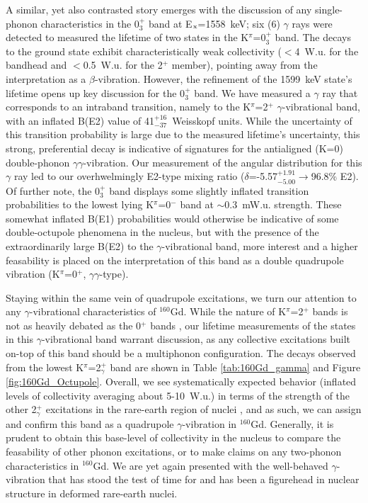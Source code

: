 A similar, yet also contrasted story emerges with the discussion of any single-phonon characteristics in the 0$^+_3$ band at E$_{\rm x}$=1558~keV; six (6) $\gamma$ rays were detected to measured the lifetime of two states in the K$^\pi$=0$^+_3$ band. The decays to the ground state exhibit characteristically weak collectivity ($<$4~W.u. for the bandhead and $<$0.5~W.u. for the 2$^+$ member), pointing away from the interpretation as a $\beta$-vibration. However, the refinement of the 1599~keV state's lifetime opens up key discussion for the 0$^+_3$ band. We have measured a $\gamma$ ray that corresponds to an intraband transition, namely to the K$^\pi$=2$^+$ $\gamma$-vibrational band, with an inflated B(E2) value of 41$^{+16}_{-37}$~Weisskopf units. While the uncertainty of this transition probability is large due to the measured lifetime's uncertainty, this strong, preferential decay is indicative of signatures for the antialigned (K=0) double-phonon $\gamma\gamma$-vibration. Our measurement of the angular distribution for this $\gamma$ ray led to our overhwelmingly E2-type mixing ratio ($\delta$=-5.57$^{+1.91}_{-5.00}\rightarrow$96.8\% E2). Of further note, the 0$^+_3$ band displays some slightly inflated transition probabilities to the lowest lying K$^\pi$=0$^-$ band at $\sim$0.3~mW.u. strength. These somewhat inflated B(E1) probabilities would otherwise be indicative of some double-octupole phenomena in the nucleus, but with the presence of the extraordinarily large B(E2) to the $\gamma$-vibrational band, more interest and a higher feasability is placed on the interpretation of this band as a double quadrupole vibration (K$^\pi$=0$^+$, $\gamma\gamma$-type). 

Staying within the same vein of quadrupole excitations, we turn our attention to any $\gamma$-vibrational characteristics of $^{160}$Gd. While the nature of K$^\pi$=2$^+$ bands is not as heavily debated as the 0$^+$ bands \cite{McGowan_BE2_1981,Burke_hexadecapole1994,PhysRevC.54.679,JAMMARI_1988}, our lifetime measurements of the states in this $\gamma$-vibrational band warrant discussion, as any collective excitations built on-top of this band should be a multiphonon configuration. The decays observed from the lowest K$^\pi$=2$^+_\gamma$ band are shown in Table \ref{tab:160Gd_gamma} and Figure \ref{fig:160Gd_Octupole}. Overall, we see systematically expected behavior (inflated levels of collectivity averaging about 5-10~W.u.) in terms of the strength of the other 2$^+_\gamma$ excitations in the rare-earth region of nuclei \cite{McGowan_BE2_1981,GROTDAL1968385,MCGOWAN_168Er_E3,KORTEN_1993}, and as such, we can assign and confirm this band as a quadrupole $\gamma$-vibration in $^{160}$Gd. Generally, it is prudent to obtain this base-level of collectivity in the nucleus to compare the feasability of other phonon excitations, or to make claims on any two-phonon characteristics in $^{160}$Gd. We are yet again presented with the well-behaved $\gamma$-vibration that has stood the test of time for and has been a figurehead in nuclear structure in deformed rare-earth nuclei.

